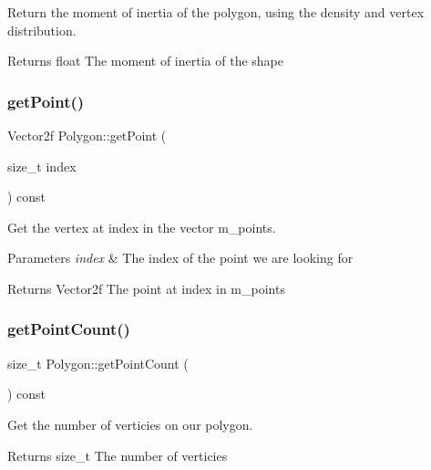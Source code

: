 Return the moment of inertia of the polygon, using the density and vertex distribution. 

\begin{DoxyReturn}{Returns}
float The moment of inertia of the shape 
\end{DoxyReturn}
\mbox{\label{class_polygon_a336e2540d24e30a4be6be163e2137323}} 
\subsubsection{\texorpdfstring{getPoint()}{getPoint()}}
{\footnotesize\ttfamily Vector2f Polygon\+::get\+Point (\begin{DoxyParamCaption}\item[{size\+\_\+t}]{index }\end{DoxyParamCaption}) const\hspace{0.3cm}{\ttfamily [virtual]}}



Get the vertex at index in the vector m\+\_\+points. 


\begin{DoxyParams}{Parameters}
{\em index} & The index of the point we are looking for \\
\hline
\end{DoxyParams}
\begin{DoxyReturn}{Returns}
Vector2f The point at index in m\+\_\+points 
\end{DoxyReturn}
\mbox{\label{class_polygon_af16db77f60fa0f12b72cf0517aca0669}} 
\subsubsection{\texorpdfstring{getPointCount()}{getPointCount()}}
{\footnotesize\ttfamily size\+\_\+t Polygon\+::get\+Point\+Count (\begin{DoxyParamCaption}{ }\end{DoxyParamCaption}) const\hspace{0.3cm}{\ttfamily [virtual]}}



Get the number of verticies on our polygon. 

\begin{DoxyReturn}{Returns}
size\+\_\+t The number of verticies 
\end{DoxyReturn}
\mbox{\label{class_polygon_a5013385231c9027d00cb57dffc030ae4}} 
